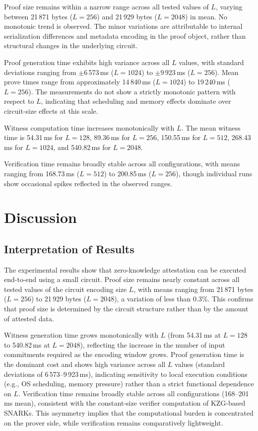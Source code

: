 \documentclass[10pt,conference,a4paper]{IEEEtran}
\begin{document}
Proof size remains within a narrow range across all tested values of $L$, varying between 21\,871 bytes ($L = 256$) and 21\,929 bytes ($L = 2048$) in mean. No monotonic trend is observed. The minor variations are attributable to internal serialization differences and metadata encoding in the proof object, rather than structural changes in the underlying circuit.

Proof generation time exhibits high variance across all $L$ values, with standard deviations ranging from $\pm$6\,573\,ms ($L = 1024$) to $\pm$9\,923\,ms ($L = 256$). Mean prove times range from approximately 14\,840\,ms ($L = 1024$) to 19\,240\,ms ($L = 256$). The measurements do not show a strictly monotonic pattern with respect to $L$, indicating that scheduling and memory effects dominate over circuit-size effects at this scale.

Witness computation time increases monotonically with $L$. The mean witness time is 54.31\,ms for $L = 128$, 89.36\,ms for $L = 256$, 150.55\,ms for $L = 512$, 268.43\,ms for $L = 1024$, and 540.82\,ms for $L = 2048$.

Verification time remains broadly stable across all configurations, with means ranging from 168.73\,ms ($L = 512$) to 200.85\,ms ($L = 256$), though individual runs show occasional spikes reflected in the observed ranges.


\section{Discussion}

\subsection{Interpretation of Results}

The experimental results show that zero-knowledge attestation can be executed end-to-end using a small circuit. Proof size remains nearly constant across all tested values of the circuit encoding size $L$, with means ranging from 21\,871 bytes ($L = 256$) to 21\,929 bytes ($L = 2048$), a variation of less than 0.3\%. This confirms that proof size is determined by the circuit structure rather than by the amount of attested data.

Witness generation time grows monotonically with $L$ (from 54.31\,ms at $L = 128$ to 540.82\,ms at $L = 2048$), reflecting the increase in the number of input commitments required as the encoding window grows. Proof generation time is the dominant cost and shows high variance across all $L$ values (standard deviations of 6\,573–9\,923\,ms), indicating sensitivity to local execution conditions (e.g., OS scheduling, memory pressure) rather than a strict functional dependence on $L$. Verification time remains broadly stable across all configurations (168–201\,ms mean), consistent with the constant-size verifier computation of KZG-based SNARKs. This asymmetry implies that the computational burden is concentrated on the prover side, while verification remains comparatively lightweight.
\end{document}
